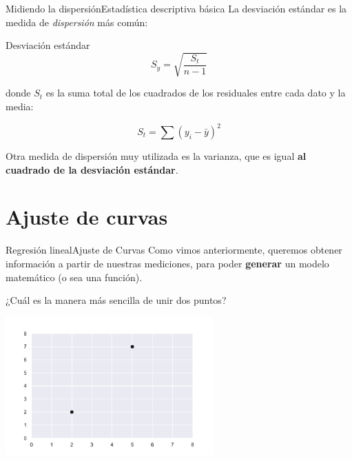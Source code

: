 \documentclass[spanish, c, dvipsnames]{beamer}
\begin{document}
\begin{frame}{Midiendo la dispersión}{Estadística descriptiva básica}
    La \alert{desviación estándar} es la medida de \textit{dispersión} más común:

    \begin{block}{Desviación estándar}
        $$S_y = \sqrt{\frac{S_t}{n-1}}$$
    \end{block}

    donde $S_t$ es la \alert{suma total de los cuadrados de los residuales} entre cada dato y la media:

    $$S_t = \sum (y_i - \bar{y})^2$$

    Otra medida de dispersión muy utilizada es la \alert{varianza}, que es igual \textbf{al cuadrado de la desviación estándar}.
\end{frame}

\section{Ajuste de curvas}

\begin{frame}{Regresión lineal}{Ajuste de Curvas}
    Como vimos anteriormente, queremos obtener información a partir de nuestras mediciones, para poder \textbf{generar} un \alert{modelo matemático} (o sea una función).

    \bigskip

    ¿Cuál es la manera más sencilla de unir dos puntos?

    \begin{center}
        \includegraphics[width=0.6\textwidth]{dots.pdf}
    \end{center}
\end{frame}
\end{document}

